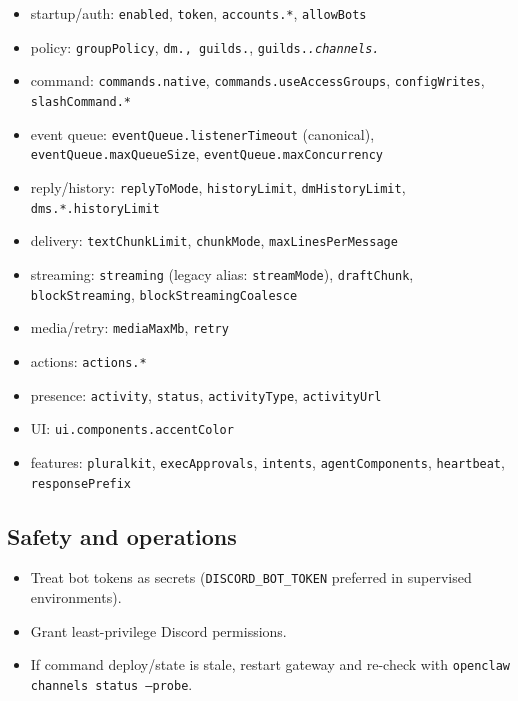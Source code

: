 \begin{itemize}
  \item startup/auth: \texttt{enabled}, \texttt{token}, \texttt{accounts.*}, \texttt{allowBots}
  \item policy: \texttt{groupPolicy}, \texttt{dm.\textit{}, \texttt{guilds.}}, \texttt{guilds.\textit{.channels.}}
  \item command: \texttt{commands.native}, \texttt{commands.useAccessGroups}, \texttt{configWrites}, \texttt{slashCommand.*}
  \item event queue: \texttt{eventQueue.listenerTimeout} (canonical), \texttt{eventQueue.maxQueueSize}, \texttt{eventQueue.maxConcurrency}
  \item reply/history: \texttt{replyToMode}, \texttt{historyLimit}, \texttt{dmHistoryLimit}, \texttt{dms.*.historyLimit}
  \item delivery: \texttt{textChunkLimit}, \texttt{chunkMode}, \texttt{maxLinesPerMessage}
  \item streaming: \texttt{streaming} (legacy alias: \texttt{streamMode}), \texttt{draftChunk}, \texttt{blockStreaming}, \texttt{blockStreamingCoalesce}
  \item media/retry: \texttt{mediaMaxMb}, \texttt{retry}
  \item actions: \texttt{actions.*}
  \item presence: \texttt{activity}, \texttt{status}, \texttt{activityType}, \texttt{activityUrl}
  \item UI: \texttt{ui.components.accentColor}
  \item features: \texttt{pluralkit}, \texttt{execApprovals}, \texttt{intents}, \texttt{agentComponents}, \texttt{heartbeat}, \texttt{responsePrefix}
\end{itemize}


\subsection{Safety and operations}


\begin{itemize}
  \item Treat bot tokens as secrets (\texttt{DISCORD\_BOT\_TOKEN} preferred in supervised environments).
  \item Grant least-privilege Discord permissions.
  \item If command deploy/state is stale, restart gateway and re-check with \texttt{openclaw channels status --probe}.
\end{itemize}


